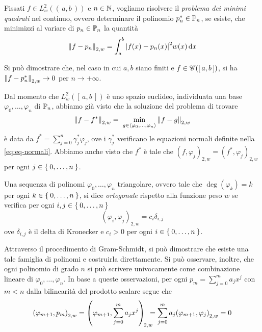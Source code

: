 	Fissati \(f \in L_w^2 ((\, a, b \,))\) e \(n \in \N\), vogliamo risolvere il \emph{problema dei minimi quadrati} nel continuo, ovvero determinare il polinomio \(p_n^* \in \P_n\), se esiste, che minimizzi al variare di \(p_n \in \P_n\) la quantità
	\begin{equation*}
		\norm{f - p_n}_{2, w} = \int_a^b \abs{f (x) - p_n (x)}^2 w (x) \dd{x}
	\end{equation*}
	
	Si può dimostrare che, nel caso in cui \(a, b\) siano finiti e \(f \in \cont ([\, a, b \,])\), si ha \(\norm{f - p_n^*}_{2, w} \to 0\) per \(n \to + \infty\).
	
	Dal momento che \(L_w^2 ([\, a, b \,])\) è uno spazio euclideo, individuata una base \(\varphi_0, \dots, \varphi_n\) di \(\P_n\), abbiamo già visto che la soluzione del problema di trovare
	\begin{equation*}
		\norm{f - f^*}_{2, w} = \; \min_{g \in \Braket{\varphi_0, \dots, \varphi_n}} \norm{f - g}_{2, w}
	\end{equation*}
	è data da \(f^* = \sum_{j = 0}^n \gamma_j^* \varphi_j\), ove i \(\gamma_j^*\) verificano le equazioni normali definite nella \eqref{eq:eq-normali}. Abbiamo anche visto che \(f^*\) è tale che \((f, \varphi_j)_{2, w} = (f^*, \varphi_j)_{2, w}\) per ogni \(j \in \Set{0, \dots, n}\).
	
	\begin{definizione}
		Una sequenza di polinomi \(\varphi_0, \dots, \varphi_n\) triangolare, ovvero tale che \(\deg (\varphi_k) = k\) per ogni \(k \in \Set{0, \dots, n}\), si dice \emph{ortogonale} rispetto alla funzione peso \(w\) se verifica per ogni \(i, j \in \Set{0, \dots, n}\)
		\begin{equation}
			(\varphi_i, \varphi_j)_{2, w} = c_i \delta_{i, j}
		\end{equation}
		ove \(\delta_{i, j}\) è il delta di Kronecker e \(c_i > 0\) per ogni \(i \in \Set{0, \dots, n}\).
	\end{definizione}

	\begin{osservazione}
		Attraverso il procedimento di Gram-Schmidt, si può dimostrare che esiste una tale famiglia di polinomi e costruirla direttamente. Si può osservare, inoltre, che ogni polinomio di grado \(n\) si può scrivere univocamente come combinazione lineare di \(\varphi_0, \dots, \varphi_n\). In base a queste osservazioni, per ogni \(p_m = \sum_{j = 0}^m a_j x^j\) con \(m < n\) dalla bilinearità del prodotto scalare segue che
		\begin{equation}
			\qty(\varphi_{m + 1}, p_m)_{2, w} = \qty(\varphi_{m + 1}, \sum_{j = 0}^m a_j x^j)_{\! 2, w} \hspace{-.7em} = \sum_{j = 0}^m a_j \qty(\varphi_{m + 1}, \varphi_j)_{2, w} = 0
		\end{equation}
	\end{osservazione}
	
